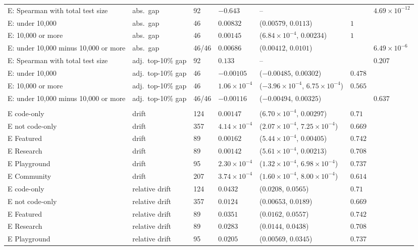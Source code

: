 {\begin{longtable}{>{\raggedright\arraybackslash}p{4.1cm}>{\raggedright\arraybackslash}p{1.9cm}p{1.1cm}p{1.9cm}p{3.5cm}p{0.9cm}p{1.6cm}}
E: Spearman with total test size & abs.\ gap & 92 & $-0.643$ & -- &  & $4.69\times10^{-12}$ \\
E: under 10,000 & abs.\ gap & 46 & $0.00832$ & ($0.00579$, $0.0113$) & $1$ &  \\
E: 10,000 or more & abs.\ gap & 46 & $0.00145$ & ($6.84\times10^{-4}$, $0.00234$) & $1$ &  \\
E: under 10,000 minus 10,000 or more & abs.\ gap & 46/46 & $0.00686$ & ($0.00412$, $0.0101$) &  & $6.49\times10^{-6}$ \\
E: Spearman with total test size & adj.\ top-10\% gap & 92 & $0.133$ & -- &  & $0.207$ \\
E: under 10,000 & adj.\ top-10\% gap & 46 & $-0.00105$ & ($-0.00485$, $0.00302$) & $0.478$ &  \\
E: 10,000 or more & adj.\ top-10\% gap & 46 & $1.06\times10^{-4}$ & ($-3.96\times10^{-4}$, $6.75\times10^{-4}$) & $0.565$ &  \\
E: under 10,000 minus 10,000 or more & adj.\ top-10\% gap & 46/46 & $-0.00116$ & ($-0.00494$, $0.00325$) &  & $0.637$ \\
\midrule
\multicolumn{7}{l}{\textbf{S3}} \\
E code-only & drift & 124 & $0.00147$ & ($6.70\times10^{-4}$, $0.00297$) & $0.71$ &  \\
E not code-only & drift & 357 & $4.14\times10^{-4}$ & ($2.07\times10^{-4}$, $7.25\times10^{-4}$) & $0.669$ &  \\
E Featured & drift & 89 & $0.00162$ & ($5.44\times10^{-4}$, $0.00405$) & $0.742$ &  \\
E Research & drift & 89 & $0.00142$ & ($5.61\times10^{-4}$, $0.00213$) & $0.708$ &  \\
E Playground & drift & 95 & $2.30\times10^{-4}$ & ($1.32\times10^{-4}$, $6.98\times10^{-4}$) & $0.737$ &  \\
E Community & drift & 207 & $3.74\times10^{-4}$ & ($1.60\times10^{-4}$, $8.00\times10^{-4}$) & $0.614$ &  \\
E code-only & relative drift & 124 & $0.0432$ & ($0.0208$, $0.0565$) & $0.71$ &  \\
E not code-only & relative drift & 357 & $0.0124$ & ($0.00653$, $0.0189$) & $0.669$ &  \\
E Featured & relative drift & 89 & $0.0351$ & ($0.0162$, $0.0557$) & $0.742$ &  \\
E Research & relative drift & 89 & $0.0283$ & ($0.0144$, $0.0438$) & $0.708$ &  \\
E Playground & relative drift & 95 & $0.0205$ & ($0.00569$, $0.0345$) & $0.737$ &  \\

\end{longtable}}

